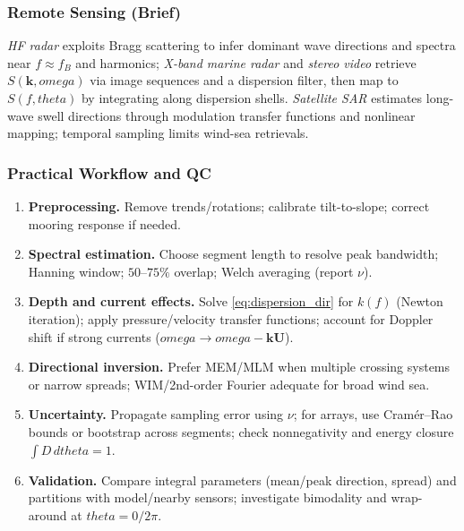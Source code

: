 \documentclass[journal,10pt,twocolumn]{IEEEtran}
\def\omega{omega}%
\def\theta{theta}%
\def\cdot{}%
\begin{document}
    \subsubsection{Remote Sensing (Brief)}
    \emph{HF radar} exploits Bragg scattering to infer dominant wave directions and spectra near $f\approx f_B$ and harmonics; \emph{X-band marine radar} and \emph{stereo video} retrieve $S(\mathbf{k},\omega)$ via image sequences and a dispersion filter, then map to $S(f,\theta)$ by integrating along dispersion shells. \emph{Satellite SAR} estimates long-wave swell directions through modulation transfer functions and nonlinear mapping; temporal sampling limits wind-sea retrievals.

    \subsubsection{Practical Workflow and QC}
    \begin{enumerate}[leftmargin=1.5em]
        \item \textbf{Preprocessing.} Remove trends/rotations; calibrate tilt-to-slope; correct mooring response if needed.
        \item \textbf{Spectral estimation.} Choose segment length to resolve peak bandwidth; Hanning window; $50$--$75\%$ overlap; Welch averaging (report $\nu$).
        \item \textbf{Depth and current effects.} Solve \eqref{eq:dispersion_dir} for $k(f)$ (Newton iteration); apply pressure/velocity transfer functions; account for Doppler shift if strong currents ($\omega\to\omega-\mathbf{k}\cdot\mathbf{U}$).
        \item \textbf{Directional inversion.} Prefer MEM/MLM when multiple crossing systems or narrow spreads; WIM/2nd-order Fourier adequate for broad wind sea.
        \item \textbf{Uncertainty.} Propagate sampling error using $\nu$; for arrays, use Cramér--Rao bounds or bootstrap across segments; check nonnegativity and energy closure $\int D\,d\theta=1$.
        \item \textbf{Validation.} Compare integral parameters (mean/peak direction, spread) and partitions with model/nearby sensors; investigate bimodality and wrap-around at $\theta=0/2\pi$.
    \end{enumerate}
\end{document}
